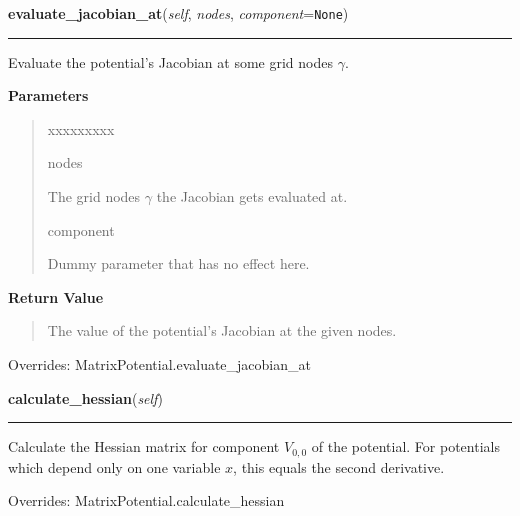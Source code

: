     \vspace{0.5ex}

\hspace{.8\funcindent}\begin{boxedminipage}{\funcwidth}

    \raggedright \textbf{evaluate\_jacobian\_at}(\textit{self}, \textit{nodes}, \textit{component}={\tt None})

    \vspace{-1.5ex}

    \rule{\textwidth}{0.5\fboxrule}
\setlength{\parskip}{2ex}
    Evaluate the potential's Jacobian at some grid nodes
    $\gamma$.

\setlength{\parskip}{1ex}
      \textbf{Parameters}
      \vspace{-1ex}

      \begin{quote}
        \begin{Ventry}{xxxxxxxxx}

          \item[nodes]

          The grid nodes $\gamma$ the Jacobian gets
          evaluated at.

          \item[component]

          Dummy parameter that has no effect here.

        \end{Ventry}

      \end{quote}

      \textbf{Return Value}
    \vspace{-1ex}

      \begin{quote}
      The value of the potential's Jacobian at the given nodes.

      \end{quote}

      Overrides: MatrixPotential.evaluate\_jacobian\_at

    \end{boxedminipage}

    \vspace{0.5ex}

\hspace{.8\funcindent}\begin{boxedminipage}{\funcwidth}

    \raggedright \textbf{calculate\_hessian}(\textit{self})

    \vspace{-1.5ex}

    \rule{\textwidth}{0.5\fboxrule}
\setlength{\parskip}{2ex}
    Calculate the Hessian matrix for component $V_{0,0}$ of the
    potential. For potentials which depend only on one variable $x$, this
    equals the second derivative.

\setlength{\parskip}{1ex}

      Overrides: MatrixPotential.calculate\_hessian

    \end{boxedminipage}

